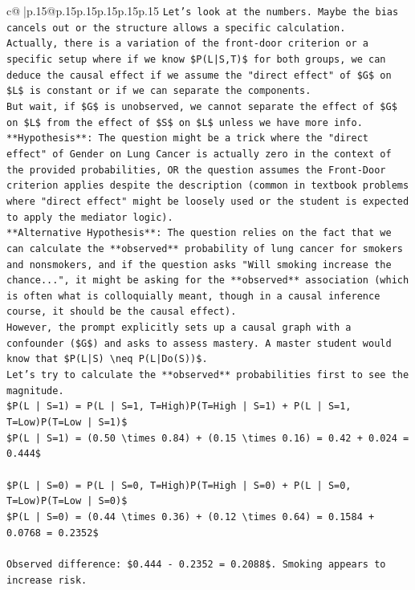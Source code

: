 \documentclass{article}
\begin{document}
{\begin{supertabular}{c@{$\;$}|p{.15\linewidth}@{}p{.15\linewidth}p{.15\linewidth}p{.15\linewidth}p{.15\linewidth}p{.15\linewidth}}
{{{\texttt{Let's look at the numbers. Maybe the bias cancels out or the structure allows a specific calculation.} \\
\texttt{Actually, there is a variation of the front{-}door criterion or a specific setup where if we know \$P(L|S,T)\$ for both groups, we can deduce the causal effect if we assume the "direct effect" of \$G\$ on \$L\$ is constant or if we can separate the components.} \\
\texttt{But wait, if \$G\$ is unobserved, we cannot separate the effect of \$G\$ on \$L\$ from the effect of \$S\$ on \$L\$ unless we have more info.} \\
\texttt{**Hypothesis**: The question might be a trick where the "direct effect" of Gender on Lung Cancer is actually zero in the context of the provided probabilities, OR the question assumes the Front{-}Door criterion applies despite the description (common in textbook problems where "direct effect" might be loosely used or the student is expected to apply the mediator logic).} \\
\texttt{**Alternative Hypothesis**: The question relies on the fact that we can calculate the **observed** probability of lung cancer for smokers and nonsmokers, and if the question asks "Will smoking increase the chance...", it might be asking for the **observed** association (which is often what is colloquially meant, though in a causal inference course, it should be the causal effect).} \\
\texttt{However, the prompt explicitly sets up a causal graph with a confounder (\$G\$) and asks to assess mastery. A master student would know that \$P(L|S) \textbackslash{}neq P(L|Do(S))\$.} \\
\texttt{Let's try to calculate the **observed** probabilities first to see the magnitude.} \\
\texttt{\$P(L | S=1) = P(L | S=1, T=High)P(T=High | S=1) + P(L | S=1, T=Low)P(T=Low | S=1)\$} \\
\texttt{\$P(L | S=1) = (0.50 \textbackslash{}times 0.84) + (0.15 \textbackslash{}times 0.16) = 0.42 + 0.024 = 0.444\$} \\
\\ 
\texttt{\$P(L | S=0) = P(L | S=0, T=High)P(T=High | S=0) + P(L | S=0, T=Low)P(T=Low | S=0)\$} \\
\texttt{\$P(L | S=0) = (0.44 \textbackslash{}times 0.36) + (0.12 \textbackslash{}times 0.64) = 0.1584 + 0.0768 = 0.2352\$} \\
\\ 
\texttt{Observed difference: \$0.444 {-} 0.2352 = 0.2088\$. Smoking appears to increase risk.} \\
}}}
\end{supertabular}}
\end{document}
